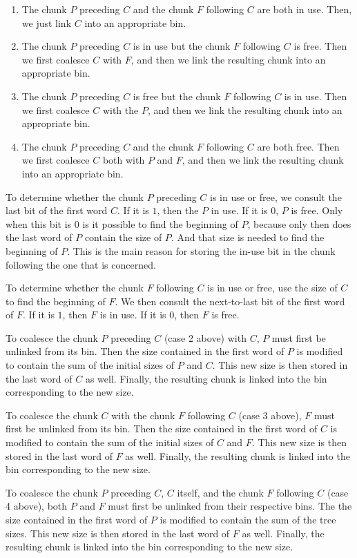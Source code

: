 \begin{enumerate}
\item The chunk $P$ preceding $C$ and the chunk $F$ following $C$
  are both in use.  Then, we just link $C$ into an appropriate
  bin.
\item The chunk $P$ preceding $C$ is in use but the chunk $F$
  following $C$ is free.  Then we first coalesce $C$ with $F$, and
  then we link the resulting chunk into an appropriate bin.
\item The chunk $P$ preceding $C$ is free but the chunk $F$ following
  $C$ is in use.  Then we first coalesce $C$ with the $P$, and then we
  link the resulting chunk into an appropriate bin.
\item The chunk $P$ preceding $C$ and the chunk $F$ following $C$ are
  both free.  Then we first coalesce $C$ both with $P$ and $F$, and
  then we link the resulting chunk into an appropriate bin.
\end{enumerate}

To determine whether the chunk $P$ preceding $C$ is in use or free, we
consult the last bit of the first word $C$.  If it is $1$, then the
$P$ in use.  If it is $0$, $P$ is free.  Only when this bit is $0$ is
it possible to find the beginning of $P$, because only then does the
last word of $P$ contain the size of $P$.  And that size is needed to
find the beginning of $P$.  This is the main reason for storing the
in-use bit in the chunk following the one that is concerned.

To determine whether the chunk $F$ following $C$ is in use or free,
use the size of $C$ to find the beginning of $F$.  We then consult the
next-to-last bit of the first word of $F$.  If it is $1$, then $F$ is
in use.  If it is $0$, then $F$ is free.

To coalesce the chunk $P$ preceding $C$ (case 2 above) with $C$, $P$
must first be unlinked from its bin.  Then the size contained in the
first word of $P$ is modified to contain the sum of the initial sizes
of $P$ and $C$.  This new size is then stored in the last word of $C$
as well.  Finally, the resulting chunk is linked into the bin
corresponding to the new size.

To coalesce the chunk $C$ with the chunk $F$ following $C$ (case 3
above), $F$ must first be unlinked from its bin.  Then the size
contained in the first word of $C$ is modified to contain the sum of
the initial sizes of $C$ and $F$.  This new size is then stored in the
last word of $F$ as well.  Finally, the resulting chunk is linked into
the bin corresponding to the new size.

To coalesce the chunk $P$ preceding $C$, $C$ itself, and the chunk $F$
following $C$ (case 4 above), both $P$ and $F$ must first be unlinked
from their respective bins.  The the size contained in the first word
of $P$ is modified to contain the sum of the tree sizes.  This new
size is then stored in the last word of $F$ as well.  Finally, the
resulting chunk is linked into the bin corresponding to the new size.
